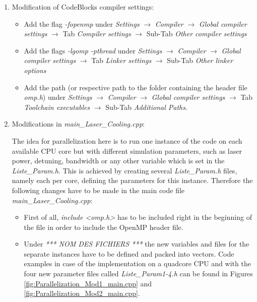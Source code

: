 \documentclass[amsmath,amssymb,nofootinbib]{revtex4-2}
\begin{document}
\begin{enumerate}
	\item Modification of CodeBlocks compiler settings:
	
	\begin{itemize}
		\item Add the flag \textit{-fopenmp} under \textit{Settings} $\rightarrow$ \textit{Compiler} $\rightarrow$ \textit{Global compiler settings} $\rightarrow$ Tab \textit{Compiler settings} $\rightarrow$ Sub-Tab \textit{Other compiler settings}
		
		\item Add the flags \textit{-lgomp -pthread} under \textit{Settings} $\rightarrow$ \textit{Compiler} $\rightarrow$ \textit{Global compiler settings} $\rightarrow$ Tab \textit{Linker settings} $\rightarrow$ Sub-Tab \textit{Other linker options}
		
		\item Add the path \textit{} (or respective path to the folder containing the header file \textit{omp.h}) under \textit{Settings} $\rightarrow$ \textit{Compiler} $\rightarrow$ \textit{Global compiler settings} $\rightarrow$ Tab \textit{Toolchain executables} $\rightarrow$ Sub-Tab \textit{Additional Paths}.
	\end{itemize}
	
	\item Modifications in \textit{main\_Laser\_Cooling.cpp}:
	
	The idea for parallelization here is to run one instance of the code on each available CPU core but with different simulation parameters, such as laser power, detuning, bandwidth or any other variable which is set in the \textit{Liste\_Param.h}. This is achieved by creating several \textit{Liste\_Param.h} files, namely each per core, defining the parameters for this instance. Therefore the following changes have to be made in the main code file \textit{main\_Laser\_Cooling.cpp}:
	
	\begin{itemize}
		\item First of all, \textit{include <omp.h>} has to be included right in the beginning of the file in order to include the OpenMP header file.
		
		\item Under \textit{\/***  NOM DES FICHIERS ***\/} the new variables and files for the separate instances have to be defined and packed into vectors. Code examples in case of the implementation on a quadcore CPU and with the four new parameter files called \textit{Liste\_Param1-4.h} can be found in Figures \ref{fig:Parallelization_Mod1_main.cpp} and  \ref{fig:Parallelization_Mod2_main.cpp}.
		

\end{itemize}
\end{enumerate}
\end{document}
